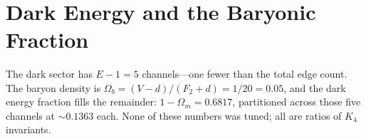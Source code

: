 \documentclass[11pt,a4paper]{book}
\begin{document}
\begin{code}
\>[0]\AgdaSpace{}%
\AgdaSymbol{:}\AgdaSpace{}%
\<%
\\
\>[0]\AgdaSpace{}%
\AgdaSymbol{=}\AgdaSpace{}%
\AgdaSpace{}%
\AgdaSpace{}%
\<%
\\
%
\\[\AgdaEmptyExtraSkip]%
\>[0]\AgdaSpace{}%
\AgdaSymbol{:}\AgdaSpace{}%
\<%
\\
\>[0]\AgdaSpace{}%
\AgdaSymbol{=}\AgdaSpace{}%
\AgdaSpace{}%
\AgdaSpace{}%
\<%
\\
%
\\[\AgdaEmptyExtraSkip]%
\>[0]\AgdaSpace{}%
\AgdaSymbol{:}\AgdaSpace{}%
\AgdaSpace{}%
\AgdaSpace{}%
\<%
\\
\>[0]\AgdaSpace{}%
\AgdaSymbol{=}\AgdaSpace{}%
\<%
\\
%
\\[\AgdaEmptyExtraSkip]%
\>[0]\AgdaSpace{}%
\AgdaSymbol{:}\AgdaSpace{}%
\<%
\\
\>[0]\AgdaSpace{}%
\AgdaSymbol{=}\AgdaSpace{}%
\AgdaSpace{}%
\AgdaSpace{}%
\<%
\\
%
\\[\AgdaEmptyExtraSkip]%
\>[0]\AgdaSpace{}%
\AgdaSymbol{:}\AgdaSpace{}%
\AgdaSpace{}%
\AgdaSpace{}%
\<%
\\
\>[0]\AgdaSpace{}%
\AgdaSymbol{=}\AgdaSpace{}%
\<%
\end{code}

\section{Dark Energy and the Baryonic Fraction}

The dark sector has $E - 1 = 5$ channels---one fewer than the total edge count. The baryon density is $\Omega_b = (V - d)/(F_2 + d) = 1/20 = 0.05$, and the dark energy fraction fills the remainder: $1 - \Omega_m = 0.6817$, partitioned across those five channels at $\sim 0.1363$ each. None of these numbers was tuned; all are ratios of $K_4$ invariants.
\end{document}
